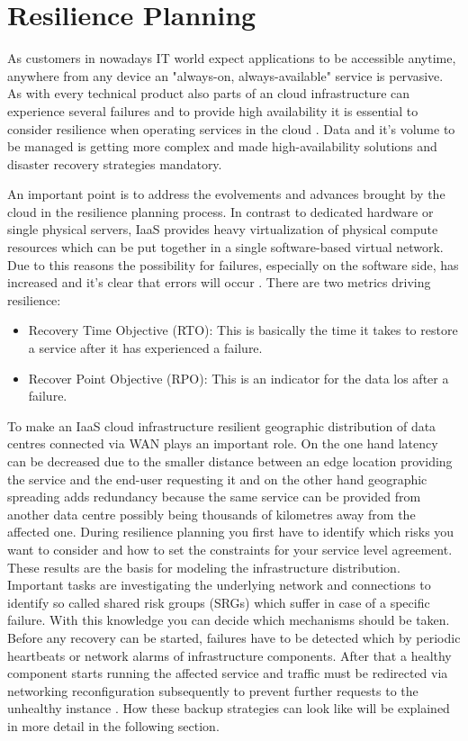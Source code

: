 \section{Resilience Planning}
As customers in nowadays IT world expect applications to be accessible anytime, anywhere from any device an "always-on, always-available" service is pervasive. As with every technical product also parts of an cloud infrastructure can experience several failures and to provide high availability it is essential to consider resilience when operating services in the cloud \cite{IBM_2014}. Data and it's volume to be managed is getting more complex  and made high-availability solutions and disaster recovery strategies mandatory. 

An important point is to address the evolvements and advances brought by the cloud in the resilience planning process. In contrast to dedicated hardware or single physical servers, IaaS provides heavy virtualization of physical compute resources which can be put together in a single software-based virtual network. Due to this reasons the possibility for failures, especially on the software side, has increased and it's clear that errors will occur \cite{IBM_2014}.   
There are two metrics driving resilience:
\begin{itemize}
	\itemsep0em 
	\item Recovery Time Objective (RTO): This is basically the time it takes to restore a service after it has experienced a failure.
	\item Recover Point Objective (RPO): This is an indicator for the data los after a failure.
\end{itemize}

To make an IaaS cloud infrastructure resilient geographic distribution of data centres connected via WAN plays an important role. On the one hand latency can be decreased due to the smaller distance between an edge location providing the service and the end-user requesting it and on the other hand geographic spreading adds redundancy because the same service can be provided from another data centre possibly being thousands of kilometres away from the affected one. 
During resilience planning you first have to identify which risks you want to consider and how to set the constraints for your service level agreement. These results are the basis for modeling the infrastructure distribution. Important tasks are investigating the underlying network and connections to identify so called shared risk groups (SRGs) which suffer in case of a specific failure. With this knowledge you can decide which mechanisms should be taken. Before any recovery can be started, failures have to be detected which by periodic heartbeats or network alarms of infrastructure components. After that a healthy component starts running the affected service and traffic must be redirected via networking reconfiguration subsequently to prevent further requests to the unhealthy instance \cite{Resilience_2014}. How these backup strategies can look like will be explained in more detail in the following section. 

